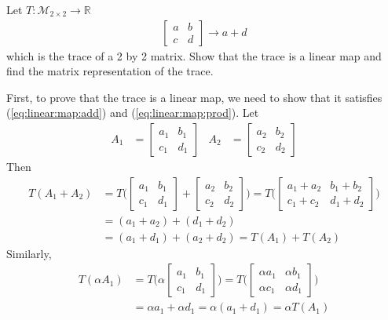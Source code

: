 \begin{example}
Let $T: \mathcal{M}_{2 \times 2} \rightarrow \mathbb{R}$
%
\begin{align*}
\begin{bmatrix}
a & b \\ c& d
\end{bmatrix} \rightarrow a + d
\end{align*}
which is the trace of a 2 by 2 matrix.  Show that the trace is a linear map and find the matrix representation of the trace. 

\solution

First, to prove that the trace is a linear map, we need to show that it satisfies (\ref{eq:linear:map:add}) and (\ref{eq:linear:map:prod}).  Let
%
\begin{align*}
A_1 & = \begin{bmatrix}
a_1 & b_1 \\ c_1& d_1
\end{bmatrix} & A_2 & = \begin{bmatrix}
a_2 & b_2 \\ c_2& d_2
\end{bmatrix}
\end{align*}
Then
%
\begin{align*}
T(A_1+A_2) & = T \biggl( \begin{bmatrix}
a_1 & b_1 \\ c_1& d_1
\end{bmatrix} + \begin{bmatrix}
a_2 & b_2 \\ c_2& d_2
\end{bmatrix} \biggr) = T \biggl( \begin{bmatrix}
a_1 + a_2 & b_1 + b_2 \\ c_1 + c_2 & d_1 + d_2 
\end{bmatrix} \biggr) \\
& = (a_1 + a_2) + (d_1 + d_2) \\
& = (a_1 + d_1) + (a_2 + d_2) = T(A_1) + T(A_2)  
\end{align*}
Similarly, 
\begin{align*}
T(\alpha A_1) & = T \biggl( \alpha \begin{bmatrix}
a_1 & b_1 \\ c_1& d_1
\end{bmatrix}\biggr) = T\biggl(\begin{bmatrix}
\alpha a_1 & \alpha  b_1 \\ \alpha c_1& \alpha d_1
\end{bmatrix} \biggr) \\
& = \alpha a_1 + \alpha d_1 = \alpha (a_1 + d_1) = \alpha T(A_1) 
\end{align*}


\end{example}
